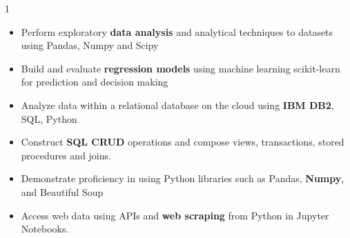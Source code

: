 \documentclass[11pt,a4paper,ragged2e]{altacv}
\begin{document}
\begin{paracol}{1}
\begin{itemize}
\item Perform exploratory \textbf{data analysis} and analytical techniques to datasets using Pandas, Numpy and Scipy
\item Build and evaluate \textbf{regression models} using machine learning scikit-learn for prediction and decision making
\end{itemize}
\tightdivider

\begin{itemize}
\item Analyze data within a relational database on the cloud using \textbf{IBM DB2}, SQL, Python
\item Construct \textbf{SQL CRUD} operations and compose views, transactions, stored procedures and joins.
\end{itemize}
\tightdivider

\begin{itemize}
\item Demonstrate proficiency in using Python libraries such as Pandas, \textbf{Numpy}, and Beautiful Soup
\item Access web data using APIs and \textbf{web scraping} from Python in Jupyter Notebooks.
\end{itemize}

\medskip



\end{paracol}
\end{document}
